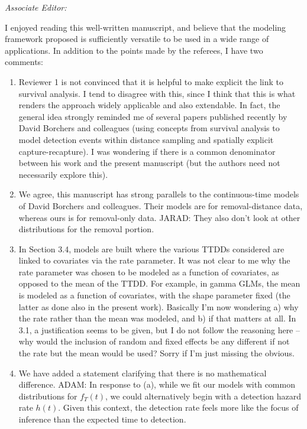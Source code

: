 \documentclass[12pt]{article}
\renewenvironment{quote}  %
              {\list{}{\rightmargin\leftmargin}\normalfont%
               \item\relax}
              {\endlist}
\newcommand{\adam}[1]{{\color{blue} ADAM: #1}}
\newcommand{\jarad}[1]{{\color{Orange} JARAD: #1}}
\begin{document}
\itshape
Associate Editor:

I enjoyed reading this well-written manuscript, and believe that the modeling framework proposed is sufficiently versatile to be used in a wide range of applications. In addition to the points made by the referees, I have two comments:
\begin{enumerate}
\item Reviewer 1 is not convinced that it is helpful to make explicit the link to survival analysis. I tend to disagree with this, since I think that this is what renders the approach widely applicable and also extendable. In fact, the general idea strongly reminded me of several papers published recently by David Borchers and colleagues (using concepts from survival analysis to model detection events within distance sampling and spatially explicit capture-recapture). I was wondering if there is a common denominator between his work and the present manuscript (but the authors need not necessarily explore this).
\begin{quote}
We agree, this manuscript has strong parallels to the continuous-time models of David Borchers and colleagues.  
Their models are for removal-distance data, whereas ours is for removal-only data.
\jarad{They also don't look at other distributions for the removal portion.}
\end{quote}


\item In Section 3.4, models are built where the various TTDDs considered are linked to covariates via the rate parameter. It was not clear to me why the rate parameter was chosen to be modeled as a function of covariates, as opposed to the mean of the TTDD. For example, in gamma GLMs, the mean is modeled as a function of covariates, with the shape parameter fixed (the latter as done also in the present work). Basically I'm now wondering a) why the rate rather than the mean was modeled, and b) if that matters at all. In 3.1, a justification seems to be given, but I do not follow the reasoning here – why would the inclusion of random and fixed effects be any different if not the rate but the mean would be used? Sorry if I'm just missing the obvious.
\begin{quote}
We have added a statement clarifying that there is no mathematical difference.
\adam{
In response to (a), while we fit our models with common distributions for $f_T(t)$, we could alternatively begin with a detection hazard rate $h(t)$.
Given this context, the detection rate feels more like the focus of inference than the expected time to detection.
}
\end{quote}
\end{enumerate}
\end{document}
